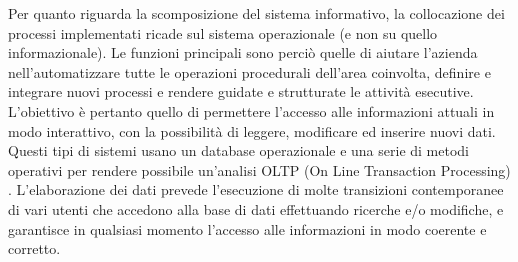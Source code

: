 \newline
Per quanto riguarda la scomposizione del sistema informativo, la collocazione dei processi implementati ricade sul sistema operazionale (e non su quello informazionale). Le funzioni principali sono perciò quelle di aiutare l'azienda nell'automatizzare tutte le operazioni procedurali dell'area coinvolta, definire e integrare nuovi processi e rendere guidate e strutturate le attività esecutive. L'obiettivo è pertanto quello di permettere l'accesso alle informazioni attuali in modo interattivo, con la possibilità di leggere, modificare ed inserire nuovi dati. Questi tipi di sistemi usano un database operazionale \cite{operational_database} e una serie di metodi operativi per rendere possibile un'analisi OLTP (On Line Transaction Processing) \cite{oltp}. L'elaborazione dei dati prevede l'esecuzione di molte transizioni contemporanee di vari utenti che accedono alla base di dati effettuando ricerche e/o modifiche, e garantisce in qualsiasi momento l'accesso alle informazioni in modo coerente e corretto.

